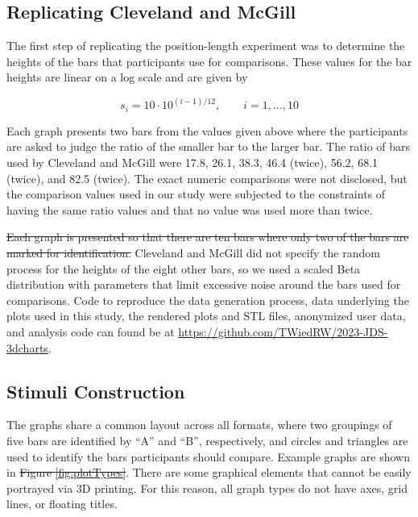 \documentclass[letterpaper,inpress,dvipsnames]{jdsart}
\providecommand{\DIFadd}[1]{{\protect\color{blue}\uwave{#1}}} %
\providecommand{\DIFdel}[1]{{\protect\color{red}\sout{#1}}}                      %
\providecommand{\DIFaddbegin}{} %
\providecommand{\DIFaddend}{} %
\providecommand{\DIFdelbegin}{} %
\providecommand{\DIFdelend}{} %
\begin{document}
\hypertarget{replicating-cleveland-and-mcgill}{%
\subsection{Replicating Cleveland and McGill}\label{replicating-cleveland-and-mcgill}}

The first step of replicating the position-length experiment was to determine the heights of the bars that participants use for comparisons.
These values for the bar heights are linear on a log scale and are given by

\[s_i=10\cdot 10^{(i-1)/12}, \qquad i=1,...,10\]

Each graph presents two bars from the values given above where the participants are asked to judge the ratio of the smaller bar to the larger bar. The ratio of bars used by Cleveland and McGill were 17.8, 26.1, 38.3, 46.4 (twice), 56.2, 68.1 (twice), and 82.5 (twice).
The exact numeric comparisons were not disclosed, but the comparison values used in our study were subjected to the constraints of having the same ratio values and that no value was used more than twice. \DIFaddbegin {\DIFadd{\textcolor{ForestGreen}{Can we show the comparison values in a table?}}}
\DIFaddend 

\DIFdelbegin \DIFdel{Each graph is presented so that there are ten bars where only two of the bars are marked for identification.
}\DIFdelend \DIFaddbegin {\DIFadd{\textcolor{ForestGreen}{In each graph, there are two sets of five bars each, and two of the bars are marked for identification with a circle and triangle}}}\DIFadd{, }{\DIFadd{\textcolor{ForestGreen}{as in \Cref{fig:bar-types}.}}}
\DIFaddend Cleveland and McGill did not specify the random process for the heights of the eight other bars, so we used a scaled Beta distribution with parameters that limit excessive noise around the bars used for comparisons.\DIFaddbegin {\DIFadd{\textcolor{ForestGreen}{What does excessive noise mean??}}}
\DIFaddend Code to reproduce the data generation process, data underlying the plots used in this study, the rendered plots and STL files, anonymized user data, and analysis code can found be at \url{https://github.com/TWiedRW/2023-JDS-3dcharts}.

\hypertarget{stimuli-construction}{%
\subsection{Stimuli Construction}\label{stimuli-construction}}

The graphs share a common layout across all formats, where two groupings of five bars are identified by ``A'' and ``B'', respectively, and circles and triangles are used to identify the bars participants should compare. Example graphs are shown in
\DIFdelbegin \DIFdel{Figure \ref{fig:plotTypes}}\DIFdelend \DIFaddbegin \DIFadd{\mbox{%
\Cref{fig:plotTypes}}\hskip0pt%
}\DIFaddend .
There are some graphical elements that cannot be easily portrayed via 3D printing. For this reason, all graph types do not have axes, grid lines, or floating titles.
\end{document}

